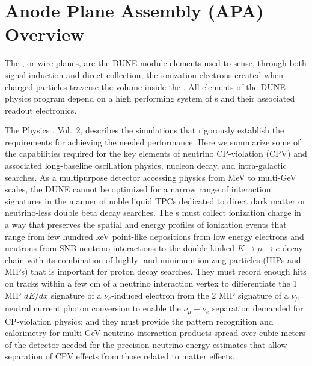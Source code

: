 \section{Anode Plane Assembly (APA) Overview}
\label{sec:fdsp-apa-intro}

The , or wire planes, are the DUNE  module elements used to sense, through both signal induction and direct collection, the ionization electrons created when charged particles traverse the  volume inside the .   All elements of the DUNE physics program depend on a high performing system of s and their associated readout electronics.  

The Physics , Vol.~2, describes the simulations that rigorously establish the requirements for achieving the needed performance.  Here we summarize some of the  capabilities required for the key elements of neutrino CP-violation (CPV) and associated long-baseline oscillation physics, nucleon decay, and intra-galactic  searches.  As a multipurpose detector accessing physics from MeV to multi-GeV scales, the DUNE  cannot be optimized for a narrow range of interaction signatures in the manner of noble liquid TPCs dedicated to direct dark matter or neutrino-less double beta decay searches.  The s must collect ionization charge in a way that preserves the spatial and energy profiles of ionization events that range from few hundred keV point-like depositions from low energy electrons and neutrons from SNB neutrino interactions to the double-kinked $K\rightarrow\mu\rightarrow{e}$ decay chain with its combination of highly- and minimum-ionizing particles (HIPs and MIPs) that is important for proton decay searches.  They must record enough hits on tracks within a few cm of a neutrino interaction vertex to differentiate the 1 MIP $dE/dx$ signature of a $\nu_e$-induced electron from the 2 MIP signature of a $\nu_\mu$ neutral current photon conversion to enable the $\nu_\mu-\nu_e$ separation demanded for CP-violation physics; and they must provide the pattern recognition and calorimetry for multi-GeV neutrino interaction products  spread over cubic meters of the detector needed for the precision neutrino energy estimates that allow separation of CPV effects from those related to matter effects. 
 
